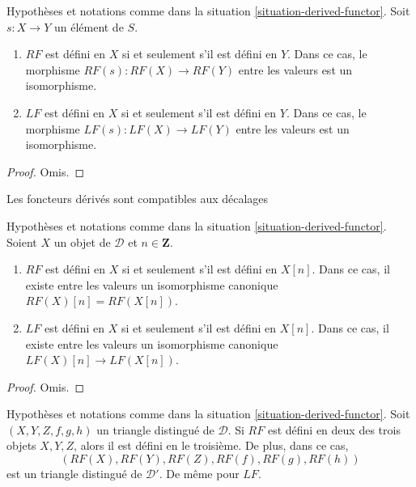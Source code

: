 \begin{lemma}
\label{lemma-derived-inverts}
Hypothèses et notations comme dans la
situation \ref{situation-derived-functor}. Soit $s : X \to Y$ un élément de
$S$.
\begin{enumerate}
\item $RF$ est défini en $X$ si et seulement s'il est défini en $Y$. Dans ce
cas, le morphisme $RF(s) : RF(X) \to RF(Y)$ entre les valeurs est un
isomorphisme.
\item $LF$ est défini en $X$ si et seulement s'il est défini en $Y$. Dans ce
cas, le morphisme $LF(s) : LF(X) \to LF(Y)$ entre les valeurs est un
isomorphisme.
\end{enumerate}
\end{lemma}

\begin{proof}
Omis.
\end{proof}

\begin{lemma}
\label{lemma-derived-shift}
\begin{slogan}
Les foncteurs dérivés sont compatibles aux décalages
\end{slogan}
Hypothèses et notations comme dans la
situation \ref{situation-derived-functor}. Soient $X$ un objet de
$\mathcal{D}$ et $n \in \mathbf{Z}$.
\begin{enumerate}
\item $RF$ est défini en $X$ si et seulement s'il est défini en $X[n]$. Dans
ce cas, il existe entre les valeurs un isomorphisme canonique
$RF(X)[n]= RF(X[n])$.
\item $LF$ est défini en $X$ si et seulement s'il est défini en $X[n]$. Dans
ce cas, il existe entre les valeurs un isomorphisme canonique
$LF(X)[n] \to LF(X[n])$.
\end{enumerate}
\end{lemma}

\begin{proof}
Omis.
\end{proof}

\begin{lemma}
\label{lemma-2-out-of-3-defined}
Hypothèses et notations comme dans la
situation \ref{situation-derived-functor}. Soit $(X, Y, Z, f, g, h)$ un
triangle distingué de $\mathcal{D}$. Si $RF$ est défini en deux des trois
objets $X, Y, Z$, alors il est défini en le troisième. De plus, dans ce cas,
$$
(RF(X), RF(Y), RF(Z), RF(f), RF(g), RF(h))
$$
est un triangle distingué de $\mathcal{D}'$. De même pour $LF$.
\end{lemma}

